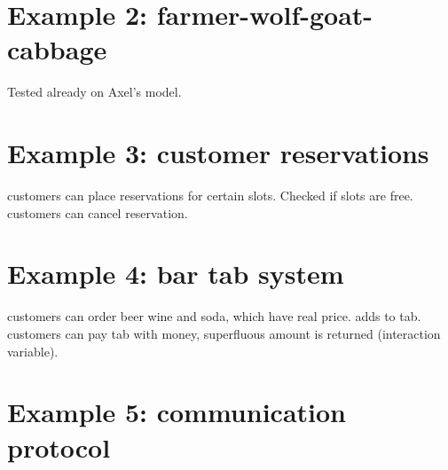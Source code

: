 \section{Example 2: farmer-wolf-goat-cabbage}
Tested already on Axel's model.

\section{Example 3: customer reservations}
customers can place reservations for certain slots. Checked if slots are free. customers can cancel reservation.

\section{Example 4: bar tab system}
customers can order beer wine and soda, which have real price. adds to tab. customers can pay tab with money, superfluous amount is returned (interaction variable).

\section{Example 5: communication protocol}
